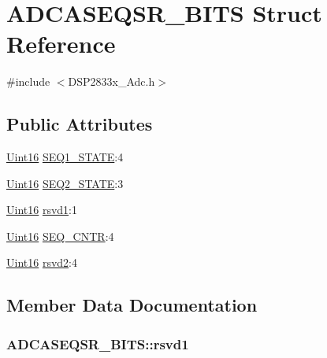 \hypertarget{struct_a_d_c_a_s_e_q_s_r___b_i_t_s}{}\section{A\+D\+C\+A\+S\+E\+Q\+S\+R\+\_\+\+B\+I\+T\+S Struct Reference}
\label{struct_a_d_c_a_s_e_q_s_r___b_i_t_s}


{\ttfamily \#include $<$D\+S\+P2833x\+\_\+\+Adc.\+h$>$}

\subsection*{Public Attributes}
\begin{DoxyCompactItemize}
\item 
\hyperlink{_d_s_p2833x___device_8h_a59a9f6be4562c327cbfb4f7e8e18f08b}{Uint16} \hyperlink{struct_a_d_c_a_s_e_q_s_r___b_i_t_s_a8f79e819c9c00436460bf0cab062d1c5}{S\+E\+Q1\+\_\+\+S\+T\+A\+T\+E}\+:4
\item 
\hyperlink{_d_s_p2833x___device_8h_a59a9f6be4562c327cbfb4f7e8e18f08b}{Uint16} \hyperlink{struct_a_d_c_a_s_e_q_s_r___b_i_t_s_a8b6a23b71a2efb02fb792808e01ec458}{S\+E\+Q2\+\_\+\+S\+T\+A\+T\+E}\+:3
\item 
\hyperlink{_d_s_p2833x___device_8h_a59a9f6be4562c327cbfb4f7e8e18f08b}{Uint16} \hyperlink{struct_a_d_c_a_s_e_q_s_r___b_i_t_s_a6eef9501b35627bf2b0792575a6299d9}{rsvd1}\+:1
\item 
\hyperlink{_d_s_p2833x___device_8h_a59a9f6be4562c327cbfb4f7e8e18f08b}{Uint16} \hyperlink{struct_a_d_c_a_s_e_q_s_r___b_i_t_s_a9d847afb6965e958c0758d7e860b0399}{S\+E\+Q\+\_\+\+C\+N\+T\+R}\+:4
\item 
\hyperlink{_d_s_p2833x___device_8h_a59a9f6be4562c327cbfb4f7e8e18f08b}{Uint16} \hyperlink{struct_a_d_c_a_s_e_q_s_r___b_i_t_s_aa17baa303588025d309e3f48f7212307}{rsvd2}\+:4
\end{DoxyCompactItemize}


\subsection{Member Data Documentation}
\hypertarget{struct_a_d_c_a_s_e_q_s_r___b_i_t_s_a6eef9501b35627bf2b0792575a6299d9}{}
\subsubsection[{rsvd1}]{ A\+D\+C\+A\+S\+E\+Q\+S\+R\+\_\+\+B\+I\+T\+S\+::rsvd1}\label{struct_a_d_c_a_s_e_q_s_r___b_i_t_s_a6eef9501b35627bf2b0792575a6299d9}
\hypertarget{struct_a_d_c_a_s_e_q_s_r___b_i_t_s_aa17baa303588025d309e3f48f7212307}{}
